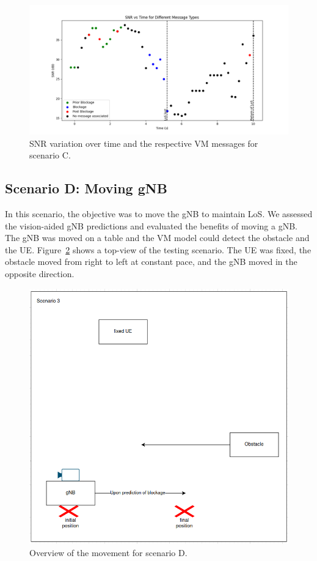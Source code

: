 \begin{figure}[H]
    \centering
    \includegraphics[width=\linewidth]{figures/results_2}
    \caption{SNR variation over time and the respective VM messages for scenario C.}
    \label{fig:results_2}
\end{figure}

\subsection{Scenario D: Moving gNB}\label{subsec:scenario-3:-moving-gnb}

In this scenario, the objective was to move the gNB to maintain LoS\@.
We assessed the vision-aided gNB predictions and evaluated the benefits of moving a gNB\@.
The gNB was moved on a table and the VM model could detect the obstacle and the UE\@.
Figure~\ref{fig:test_movgnb} shows a top-view of the testing scenario.
The UE  was fixed, the obstacle moved from right to left at constant pace, and the gNB moved in the opposite direction.

\begin{figure}[H]
    \centering
    \includegraphics[width=0.5\linewidth]{figures/scenario3}
    \caption{Overview of the movement for scenario D.}
    \label{fig:test_movgnb}
\end{figure}

